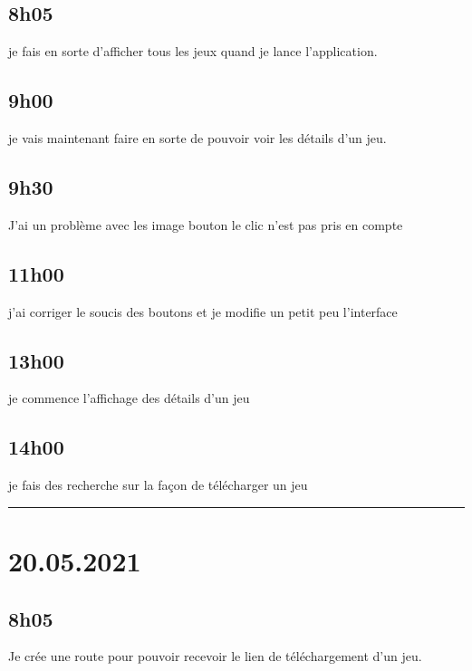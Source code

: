 \documentclass[a4paper,12pt,french]{sphinxmanual}
\begin{document}
\subsection{8h05}
\label{\detokenize{logbook:id130}}
\sphinxAtStartPar
je fais en sorte d’afficher tous les jeux quand je lance l’application.


\subsection{9h00}
\label{\detokenize{logbook:id131}}
\sphinxAtStartPar
je vais maintenant faire en sorte de pouvoir voir les détails d’un jeu.


\subsection{9h30}
\label{\detokenize{logbook:id132}}
\sphinxAtStartPar
J’ai un problème avec les image bouton le clic n’est pas pris en compte


\subsection{11h00}
\label{\detokenize{logbook:id133}}
\sphinxAtStartPar
j’ai corriger le soucis des boutons et je modifie un petit peu l’interface


\subsection{13h00}
\label{\detokenize{logbook:id134}}
\sphinxAtStartPar
je commence l’affichage des détails d’un jeu


\subsection{14h00}
\label{\detokenize{logbook:id135}}
\sphinxAtStartPar
je fais des recherche sur la façon de télécharger un jeu


\bigskip\hrule\bigskip



\section{20.05.2021}
\label{\detokenize{logbook:id136}}

\subsection{8h05}
\label{\detokenize{logbook:id137}}
\sphinxAtStartPar
Je crée une route pour pouvoir recevoir le lien de téléchargement d’un jeu.
\end{document}
